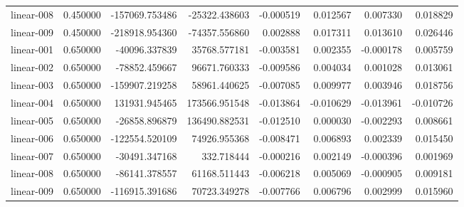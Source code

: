 \begin{tabular}{lrrrrrrr}
linear-008 & 0.450000 & -157069.753486 & -25322.438603 & -0.000519 & 0.012567 & 0.007330 & 0.018829 \\
linear-009 & 0.450000 & -218918.954360 & -74357.556860 & 0.002888 & 0.017311 & 0.013610 & 0.026446 \\
linear-001 & 0.650000 & -40096.337839 & 35768.577181 & -0.003581 & 0.002355 & -0.000178 & 0.005759 \\
linear-002 & 0.650000 & -78852.459667 & 96671.760333 & -0.009586 & 0.004034 & 0.001028 & 0.013061 \\
linear-003 & 0.650000 & -159907.219258 & 58961.440625 & -0.007085 & 0.009977 & 0.003946 & 0.018756 \\
linear-004 & 0.650000 & 131931.945465 & 173566.951548 & -0.013864 & -0.010629 & -0.013961 & -0.010726 \\
linear-005 & 0.650000 & -26858.896879 & 136490.882531 & -0.012510 & 0.000030 & -0.002293 & 0.008661 \\
linear-006 & 0.650000 & -122554.520109 & 74926.955368 & -0.008471 & 0.006893 & 0.002339 & 0.015450 \\
linear-007 & 0.650000 & -30491.347168 & 332.718444 & -0.000216 & 0.002149 & -0.000396 & 0.001969 \\
linear-008 & 0.650000 & -86141.378557 & 61168.511443 & -0.006218 & 0.005069 & -0.000905 & 0.009181 \\
linear-009 & 0.650000 & -116915.391686 & 70723.349278 & -0.007766 & 0.006796 & 0.002999 & 0.015960 \\
\bottomrule
\end{tabular}
